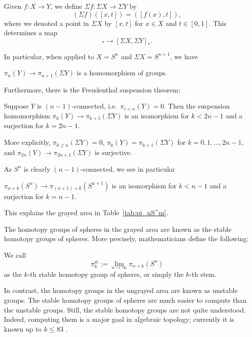 \documentclass[12pt]{article}
\numberwithin{equation}{section}
\numberwithin{figure}{section}
\theoremstyle{remark}
\begin{document}
\begin{definition}
Given $f:X\to Y$, we define $\Sigma f:\Sigma X\to \Sigma Y$ by \begin{equation}
  (\Sigma f)([x,t]) = ([f(x),t]),
\end{equation}
where we denoted a point in $\Sigma X$ by $[x,t]$ for $x\in X$ and $t\in[0,1]$.
This determines a map \begin{equation}
[X,Y]_*\to [\Sigma X,\Sigma Y]_*.
\end{equation}
\end{definition}

In particular, when applied to $X=S^n$ and $\Sigma X=S^{n+1}$, we have 
\begin{proposition}
$\pi_n(Y)\to \pi_{n+1}(\Sigma Y)$ is a homomorphism of groups.
\end{proposition}
Furthermore, there is the Freudenthal suspension theorem:
\begin{theorem}
Suppose $Y$ is $(n-1)$-connected, i.e.~$\pi_{i<n}(Y)=0$.
Then the suspension homomorphism $\pi_k(Y)\to \pi_{k+1}(\Sigma Y)$ is an isomorphism for $k< 2n-1$ and a surjection for $k=2n-1$.
\end{theorem}
More explicitly, $\pi_{k\ge n}(\Sigma Y)=0$,
$\pi_{k}(Y)=\pi_{k+1}(\Sigma Y)$ for $k=0,1,\ldots,2n-1$,
and $\pi_{2n}(Y)\to \pi_{2n+1}(\Sigma Y)$ is surjective.

As $S^n$ is clearly $(n-1)$-connected, we see in particular 
\begin{proposition}
  $\pi_{n+k}(S^n)\to \pi_{(n+1)+k}(S^{n+1})$ 
  is an isomorphism for $k<n-1$ and a surjection for $k=n-1$.
\end{proposition}
This explains the grayed area in Table~\ref{tab:pi_nS^m}.

The homotopy groups of spheres in the grayed area 
are known as the stable homotopy groups of spheres.
More precisely, mathematicians define the following:
\begin{definition}
  We call \begin{equation}
   \pi^\text{st}_k := \lim_{n\to\infty} \pi_{n+k}(S^n)
  \end{equation}
as the $k$-th stable homotopy group of spheres,
or simply the $k$-th stem.
\end{definition}

In contrast, the homotopy groups in the ungrayed area
are known as unstable groups.
The stable homotopy groups of spheres are much easier to compute than the unstable groups.
Still, the stable homotopy groups are not quite understood.
Indeed, computing them is a major goal in algebraic topology;
currently it is known up to $k\le 83$ \cite{Isaksen}.
\end{document}
